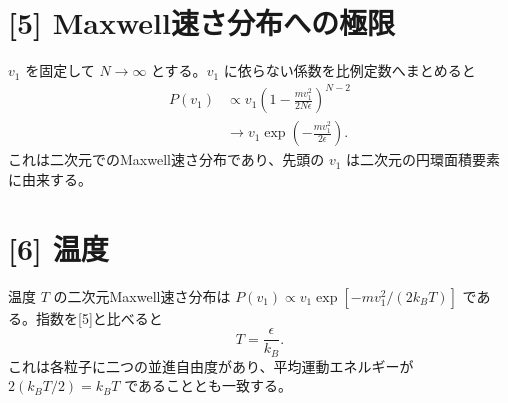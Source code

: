 \documentclass[11pt,a4paper]{article}
\begin{document}
\section*{[5] Maxwell速さ分布への極限}
$v_1$ を固定して $N\to\infty$ とする。$v_1$ に依らない係数を比例定数へまとめると
\begin{align}
 P(v_1)&\propto v_1\left(1-\frac{mv_1^2}{2N\epsilon}\right)^{N-2}\\
 &\longrightarrow v_1\exp\!\left(-\frac{mv_1^2}{2\epsilon}\right).
\end{align}
これは二次元でのMaxwell速さ分布であり、先頭の $v_1$ は二次元の円環面積要素に由来する。

\section*{[6] 温度}
温度 $T$ の二次元Maxwell速さ分布は
$P(v_1)\propto v_1\exp[-mv_1^2/(2k_BT)]$ である。指数を[5]と比べると
\begin{equation}
 \boxed{T=\frac{\epsilon}{k_B}.}
\end{equation}
これは各粒子に二つの並進自由度があり、平均運動エネルギーが
$2(k_BT/2)=k_BT$ であることとも一致する。
\end{document}
